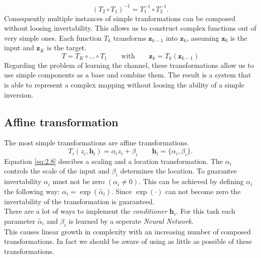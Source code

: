 \documentclass[oneside]{msvreport}%
\newcommand{\B}[1]{\boldsymbol{#1}}
\newcommand{\e}[1]{\emph{#1}}
\begin{document}
\begin{equation}
  (T_2 \circ T_1)^{-1} = T_1^{-1} \circ T_2^{-1}.
\end{equation}
Consequently multiple instances of simple tranformations can be composed without loosing invertability. This allows us to construct complex functions out of very simple ones. Each function $T_k$ transforms $\B{z}_{k-1}$ into $\B{z}_k$, assuming $\B{z}_0$ is the input and $\B{z}_K$ is the target.
\begin{equation}
  T = T_K \circ ... \circ T_1 \qquad \text{with} \qquad \B{z}_k = T_k(\B{z}_{k-1})
\end{equation}
Regarding the problem of learning the channel, these transformations allow us to use simple components as a base and combine them. The result is a system that is able to represent a complex mapping without loosing the ability of a simple inversion.

\newpage
\subsection{Affine transformation}
The most simple transformations are affine transformations.
\begin{equation}
  T_i(z_i, \B{h}_i) = \alpha_iz_i + \beta_i \qquad \B{h}_i = \{\alpha_i, \beta_i\} \label{eq:2.8}.
\end{equation}
Equation \ref{eq:2.8} descibes a scaling and a location transformation. The $\alpha_i$ controls the scale of the input and $\beta_i$ determines the location. To guarantee invertability $\alpha_i$ must not be zero $(\alpha_i \neq 0)$. This can be achieved by defining $\alpha_i$ the following way: $\alpha_i = \exp(\tilde{\alpha_i})$. Since $\exp(\cdot)$ can not become zero the invertability of the transformation is guaranteed. \\There are a lot of ways to implement the \e{conditioner} $\B{h}_i$. For this task  each parameter $\tilde{\alpha_i}$ and $\beta_i$ is learned by a seperate \e{Neural Network}.\\ This causes linear growth in complexity with an increasing number of composed transformations. In fact we should be aware of using as little as possible of these transformations.
\end{document}
